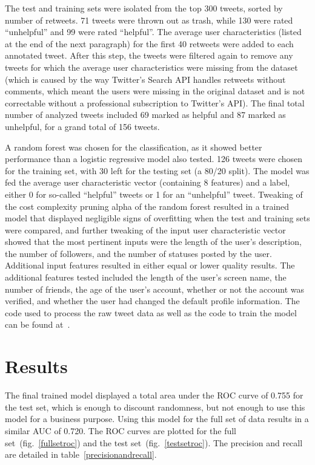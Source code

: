 \documentclass[conference]{IEEEtran}
\begin{document}
The test and training sets were isolated from the top 300 tweets,
sorted by number of retweets. 71 tweets were thrown out as trash,
while 130 were rated ``unhelpful'' and 99 were rated ``helpful''.
The average user characteristics (listed at the end of the next
paragraph) for the first 40 retweets were added to each annotated
tweet. After this step, the tweets were filtered again to remove
any tweets for which the average user characteristics were
missing from the dataset (which is caused by the way Twitter's
Search API handles retweets without comments, which meant the
users were missing in the original dataset and is not
correctable without a professional subscription to Twitter's
API). The final total number of analyzed tweets included 69
marked as helpful and 87 marked as unhelpful, for a grand total
of 156 tweets.

A random forest was chosen for the classification, as it showed
better performance than a logistic regressive model also tested.
126 tweets were chosen for the training set, with 30 left for the
testing set (a 80/20 split).  The model was fed the average user
characteristic vector (containing 8 features) and a label, either
0 for so-called ``helpful'' tweets or 1 for an ``unhelpful''
tweet. Tweaking of the cost complexity pruning alpha of the
random forest resulted in a trained model that displayed
negligible signs of overfitting when the test and training sets
were compared, and further tweaking of the input user
characteristic vector showed that the most pertinent inputs were
the length of the user's description, the number of followers,
and the number of statuses posted by the user.  Additional input
features resulted in either equal or lower quality results. The
additional features tested included the length of the user's
screen name, the number of friends, the age of the user's
account, whether or not the account was verified, and whether the
user had changed the default profile information. The code used
to process the raw tweet data as well as the code to train the
model can be found at~\cite{myghrepo}.

\section{Results}

The final trained model displayed a total area under the ROC
curve of 0.755 for the test set, which is enough to discount
randomness, but not enough to use this model for a business
purpose. Using this model for the full set of data results in a
similar AUC of 0.720. The ROC curves are plotted for the full
set~(fig.~\ref{fullsetroc}) and the test
set~(fig.~\ref{testsetroc}).  The precision and recall are
detailed in table~\ref{precisionandrecall}.
\end{document}
